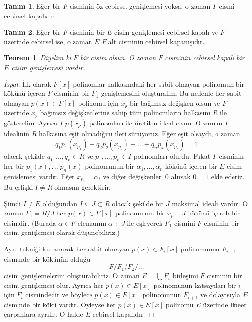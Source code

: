 \documentclass{article}
\newtheorem{thm}{Teorem}[section]
\theoremstyle{definition}
\newtheorem{defn}{Tanım}[section]
\theoremstyle{remark}
\begin{document}
            \begin{defn}
                Eğer bir $F$ cisminin öz cebirsel genişlemesi yoksa, o zaman $F$ cismi cebirsel kapalıdır.
            \end{defn}
            
            \begin{defn}
                Eğer bir $F$ cisminin bir $E$ cisim genişlemesi cebirsel kapalı ve $F$ üzerinde cebirsel ise, o zaman $E$ $F$ alt cisminin cebirsel kapanışıdır.
            \end{defn}
            
            \begin{thm}
                Diyelim ki $F$ bir cisim olsun. O zaman $F$ cisminin cebirsel kapalı bir $E$ cisim genişlemesi vardır.
            \end{thm}
            
            \begin{proof}[İspat]
                İlk olarak $F[x]$ polinomlar halkasındaki her sabit olmayan polinomun bir kökünü içeren $F$ cisminin bir $F_1$ genişlemesini oluşturalım. Bu nedenle her sabit olmayan $p(x) \in F[x]$ polinomu için $x_p$ bir bağımsız değişken olsun ve $F$ üzerinde $x_p$ bağımsız değişkenlerine sahip tüm polinomların halkasını $R$ ile gösterelim. Ayrıca $I$ $p(x_p)$ polinomları ile üretilen ideal olsun. O zaman $I$ idealinin $R$ halkasına eşit olmadığını ileri sürüyoruz. Eğer eşit olsaydı, o zaman
                \begin{equation*}
                    q_1p_1(x_{p_1}) + q_2p_2(x_{p_2}) + \dots + q_np_n(x_{p_n}) = 1
                \end{equation*}
                olacak şekilde $q_1, \dots, q_n \in R$ ve $p_1, \dots, p_n \in I$ polinomları olurdu. Fakat $F$ cisminin her bir $p_1(x), \dots, p_n(x)$ polinomunun bir $\alpha_1, \dots, \alpha_n$ kökünü içeren bir $E$ cisim genişlemesi vardır. Eğer $x_{p_i} = \alpha_i$ ve diğer değişkenleri $0$ alırsak $0 = 1$ elde ederiz. Bu çelişki $I \neq R$ olmasını gerektirir.\par
                Şimdi $I \neq E$ olduğundan $I \subseteq J \subset R$ olacak şekilde bir $J$ maksimal ideali vardır. O zaman $F_1 = R / J$ her $p(x) \in F[x]$ polinomunun bir $x_p + J$ kökünü içereb bir cisimdir. (Burada $\alpha \in F$ elemanını $\alpha + J$ ile eşleyerek $F_1$ cismini $F$ cisminin bir cisim genişlemesi olarak düşünebiliriz.)\par
                Aynı tekniği kullanarak her sabit olmayan $p(x) \in F_i[x]$ polinomunun $F_{i + 1}$ cisminde bir kökünün olduğu
                \begin{equation*}
                    F / F_1 / F_2 / \dots
                \end{equation*}
                cisim genişlemelerini oluşturabiliriz. O zaman $E = \bigcup F_i$ birleşimi $F$ cisminin bir cisim genişlemesi olur. Ayrıca her $p(x) \in E[x]$ polinomunun katsayıları bir $i$ için $F_i$ cismindedir ve böylece $p(x) \in E[x]$ polinomunun $F_{i + 1}$ ve dolayısıyla $E$ cisminde bir kökü vardır. Öyleyse her $p(x) \in E[x]$ polinomu $E$ üzerinde lineer çarpanlara ayrılır. O halde $E$ cebirsel kapalıdır.
            \end{proof}
            
\end{document}
